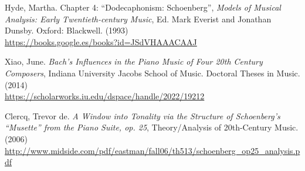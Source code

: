 \begin{thebibliography}{00}
			{ Hyde, Martha.} Chapter 4: ``Dodecaphonism: Schoenberg'',
			\textit{Models of Musical Analysis: Early Twentieth-century Music},
			Ed. Mark Everist and Jonathan Dunsby.
			Oxford: Blackwell.
			(1993)
			\\\url{https://books.google.es/books?id=JSdVHAAACAAJ}
					
			{ Xiao, June.} 
			\textit{Bach's Influences in the Piano Music of Four 20th Century Composers},
			Indiana University Jacobs School of Music.
			Doctoral Theses in Music.
			(2014)
			\\\url{https://scholarworks.iu.edu/dspace/handle/2022/19212}
			
			{ Clercq, Trevor de.} 
			\textit{A Window into Tonality via the Structure of Schoenberg's ``Musette'' from the Piano Suite, op. 25},
			Theory/Analysis of 20th-Century Music.
			(2006)
			\\\url{http://www.midside.com/pdf/eastman/fall06/th513/schoenberg_op25_analysis.pdf}
						
	\end{thebibliography}